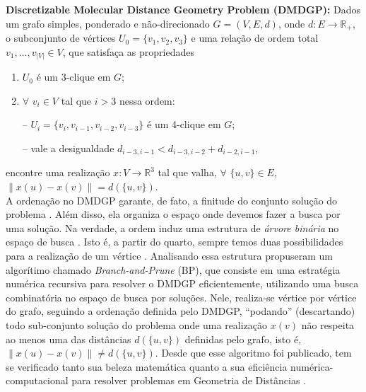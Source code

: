 \documentclass[a4,11pt]{pssbmac}
\begin{document}
	\textbf{Discretizable Molecular Distance Geometry Problem (DMDGP): }Dados um grafo simples, ponderado e não-direcionado $G = (V,E,d)$, onde $d: E \rightarrow \mathbb{R}_{+}$, o subconjunto de vértices $U_{0} = \{v_{1},v_{2},v_{3} \}$ e uma relação de ordem total $v_1, \dots, v_{|V|} \in V$, que satisfaça as propriedades
	\begin{enumerate}
		\item $U_{0}$ é um 3-clique em $G$;
		\vspace{-0.6cm}
		\item 
		\begin{minipage}{0.4\linewidth}  
			$\forall$ $v_{i} \in V$ tal que $i > 3$ nessa ordem:
		\end{minipage}
		\begin{minipage}{0.6\linewidth}
			\vspace{0.6cm}
			-- $U_{i} = \{v_i, v_{i-1}, v_{i-2}, v_{i-3}\}$ é um 4-clique em $G$;
			\vspace{0.2cm}
						
			-- vale a desigualdade $d_{i-3,i-1} < d_{i-3,i-2} + d_{i-2,i-1}$,
		\end{minipage}
		
	\end{enumerate}
	encontre uma realização $x: V \rightarrow \mathbb{R}^{3}$ tal que valha, $\forall$ $\{u,v\} \in E$, $\left\| x(u) - x(v) \right\| = d(\{u,v\})$.
	\\
	
	A ordenação no DMDGP garante, de fato, a finitude do conjunto solução do problema \cite{carlileBook31Coloquio}. Além disso, ela organiza o espaço onde devemos fazer a busca por uma solução. Na verdade, a ordem induz uma estrutura de \textit{árvore binária} no espaço de busca \cite{fidalgotese}. Isto é, a partir do quarto, sempre temos duas possibilidades para a realização de um vértice \cite{carlileDMDGP}. Analisando essa estrutura propuseram um algorítimo chamado \textit{Branch-and-Prune} (BP), que consiste em uma estratégia numérica recursiva para resolver o DMDGP eficientemente, utilizando uma busca combinatória no espaço de busca por soluções. Nele, realiza-se vértice por vértice do grafo, seguindo a ordenação definida pelo DMDGP, ``podando'' (descartando) todo sub-conjunto solução do problema onde uma realização $x(v)$ não respeita ao menos uma das distâncias $d(\{u,v\})$ definidas pelo grafo, isto é, $\left\| x(u) - x(v) \right\| \neq d(\{u,v\})$. Desde que esse algoritmo foi publicado, tem se verificado tanto sua beleza matemática quanto a sua eficiência numérica-computacional para resolver problemas em Geometria de Distâncias \cite{fidalgotese}. 
	
\end{document}
